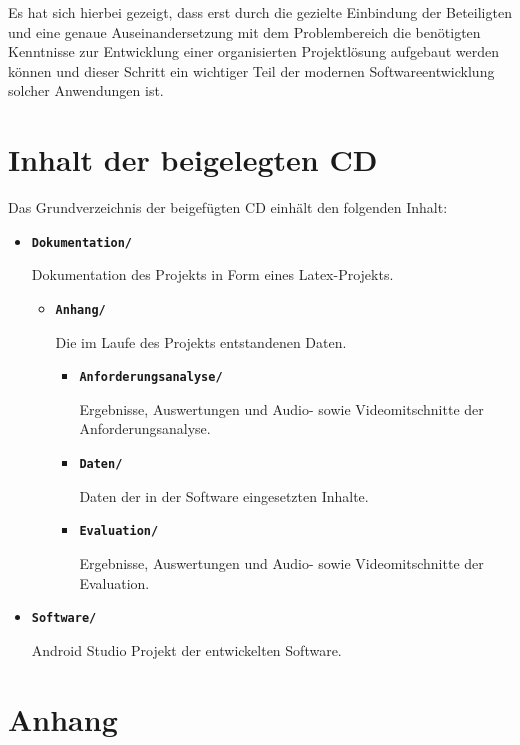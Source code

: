 \documentclass[bibliography=totoc,listof=totoc,BCOR=5mm,DIV=12,oneside]{scrbook}
\begin{document}
{\par \bigskip Es hat sich hierbei gezeigt, dass erst durch die gezielte Einbindung der Beteiligten und eine genaue Auseinandersetzung mit dem Problembereich die benötigten Kenntnisse zur Entwicklung einer organisierten Projektlösung aufgebaut werden können und dieser Schritt ein wichtiger Teil der modernen Softwareentwicklung solcher Anwendungen ist.

\listoffigures
\listoftables
\lstlistoflistings


\chapter*{Inhalt der beigelegten CD}
\par Das Grundverzeichnis der beigefügten CD einhält den folgenden Inhalt:

\begin{itemize}
\item[] \textbf{\texttt{Dokumentation/}}
\par Dokumentation des Projekts in Form eines Latex-Projekts.
\begin{itemize}
\item[] \textbf{\texttt{Anhang/}}
\par Die im Laufe des Projekts entstandenen Daten.
	\begin{itemize}
		\item[] \textbf{\texttt{Anforderungsanalyse/}}
		\par Ergebnisse, Auswertungen und Audio- sowie Videomitschnitte der Anforderungsanalyse.
		\item[] \textbf{\texttt{Daten/}}
		\par Daten der in der Software eingesetzten Inhalte.
		\item[] \textbf{\texttt{Evaluation/}}
		\par Ergebnisse, Auswertungen und Audio- sowie Videomitschnitte der Evaluation.
	\end{itemize}
\end{itemize}
\item[] \textbf{\texttt{Software/}}
\par Android Studio Projekt der entwickelten Software.
\end{itemize}

\newpage
\appendix


\chapter{Anhang}

}
\end{document}
